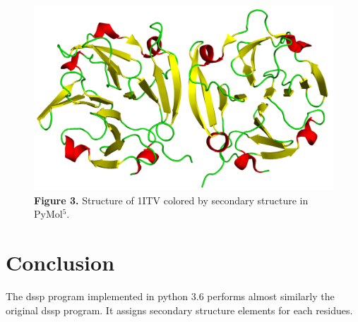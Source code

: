 \documentclass[12pt]{article}
\begin{document}
 \begin{figure}[h!]
 	\centering
 	\includegraphics[totalheight=8cm]{img/1itv.png}
 	\label{fig:verticalcell}
 	\footnotesize\textbf{\\Figure 3.} Structure of 1ITV colored by secondary structure in PyMol$^5$.
 \end{figure}
\section{Conclusion}
The dssp program implemented in python 3.6 performs almost similarly the original dssp program. It assigns secondary structure elements for each residues.
\end{document}

